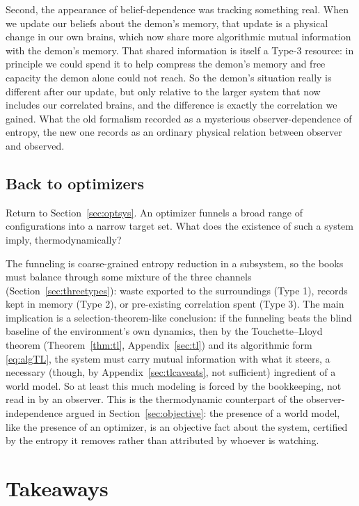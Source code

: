 \documentclass[10pt]{article}
\theoremstyle{definition}
\theoremstyle{remark}
\begin{document}
Second, the appearance of belief-dependence was tracking something real. When we update our beliefs about the demon's memory, that update is a physical change in our own brains, which now share more algorithmic mutual information with the demon's memory. That shared information is itself a Type-3 resource: in principle we could spend it to help compress the demon's memory and free capacity the demon alone could not reach. So the demon's situation really is different after our update, but only relative to the larger system that now includes our correlated brains, and the difference is exactly the correlation we gained. What the old formalism recorded as a mysterious observer-dependence of entropy, the new one records as an ordinary physical relation between observer and observed.

\subsection{Back to optimizers}
\label{sec:backtoflint}

Return to Section~\ref{sec:optsys}. An optimizer funnels a broad range of configurations into a narrow target set. What does the existence of such a system imply, thermodynamically?

The funneling is coarse-grained entropy reduction in a subsystem, so the books must balance through some mixture of the three channels (Section~\ref{sec:threetypes}): waste exported to the surroundings (Type 1), records kept in memory (Type 2), or pre-existing correlation spent (Type 3). The main implication is a selection-theorem-like conclusion: if the funneling beats the blind baseline of the environment's own dynamics, then by the Touchette--Lloyd theorem (Theorem~\ref{thm:tl}, Appendix~\ref{sec:tl}) and its algorithmic form \eqref{eq:algTL}, the system must carry mutual information with what it steers, a necessary (though, by Appendix~\ref{sec:tlcaveats}, not sufficient) ingredient of a world model. So at least this much modeling is forced by the bookkeeping, not read in by an observer. This is the thermodynamic counterpart of the observer-independence argued in Section~\ref{sec:objective}: the presence of a world model, like the presence of an optimizer, is an objective fact about the system, certified by the entropy it removes rather than attributed by whoever is watching.

\section{Takeaways}
\label{sec:takeaways}
\end{document}
